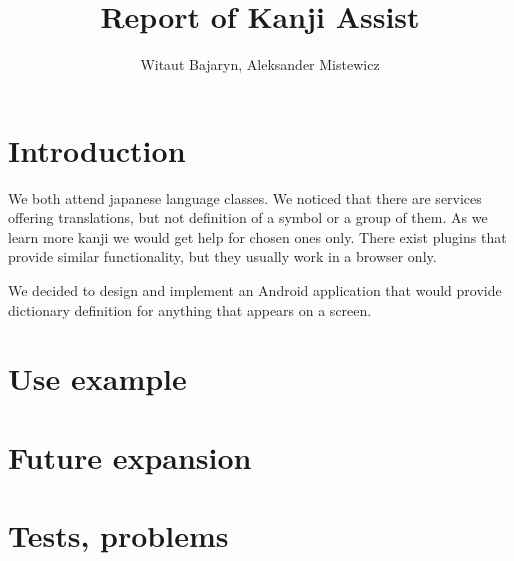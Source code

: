 \documentclass[11pt,a4paper]{article}
\title{Report of Kanji Assist}
\author{Witaut Bajaryn, Aleksander Mistewicz}
\begin{document}
\maketitle
\newpage

\section{Introduction}

We both attend japanese language classes. We noticed that there are services
offering translations, but not definition of a symbol or a group of them.
As we learn more kanji we would get help for chosen ones only.
There exist plugins that provide similar functionality, but they usually
work in a browser only.

We decided to design and implement an Android application that would
provide dictionary definition for anything that appears on a screen.

\section{Use example}

\section{Future expansion}

\section{Tests, problems}
\end{document}
